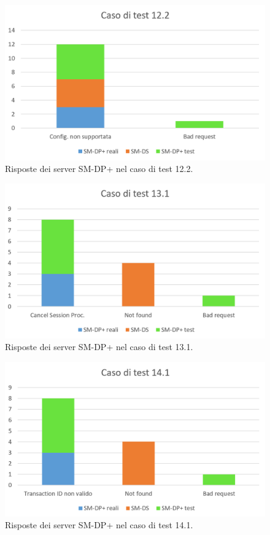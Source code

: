 \documentclass[10pt, oneside]{book}
\begin{document}
\begin{figure}
\includegraphics[width=\linewidth]{test-12-2.png}
\caption{Risposte dei server SM-DP+ nel caso di test 12.2.}
\label{fig:test-12-2}
\end{figure}
\begin{figure}
\includegraphics[width=\linewidth]{test-13-1.png}
\caption{Risposte dei server SM-DP+ nel caso di test 13.1.}
\label{fig:test-13-1}
\end{figure}
\begin{figure}
\includegraphics[width=\linewidth]{test-14-1.png}
\caption{Risposte dei server SM-DP+ nel caso di test 14.1.}
\label{fig:test-14-1}
\end{figure}
\end{document}
